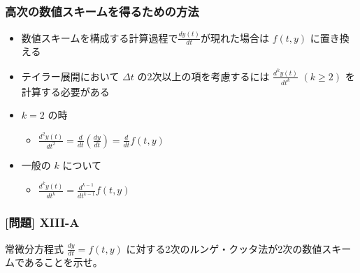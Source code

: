 \documentclass[dvipdfmx,aspectratio=169,20pt]{beamer}
\newcommand{\myfontsetting}[3]{{\fontsize{#1}{#2}\selectfont #3}}
\begin{document}
\begin{frame}
\frametitle{\large 高次の数値スキームを得るための方法}
\begin{itemize}
    \item \myfontsetting{14pt}{14pt}{数値スキームを構成する計算過程で\myfontsetting{12pt}{12pt}{$\displaystyle \frac{dy(t)}{dt}$}が現れた場合は $f(t,y)$ に置き換える}
    \item \myfontsetting{14pt}{14pt}{テイラー展開において $\varDelta t$ の2次以上の項を考慮するには \myfontsetting{12pt}{12pt}{$\displaystyle \frac{d^k y(t)}{dt^k}$ $(k\ge 2)$} を計算する必要がある}
    \item \myfontsetting{14pt}{14pt}{$k=2$ の時}
    \begin{itemize}
        \item \myfontsetting{12pt}{12pt}{$\displaystyle\frac{d^2y(t)}{dt^2}=\frac{d}{dt}\left(\frac{dy}{dt} \right) = \frac{d}{dt}f(t,y)$} 
    \end{itemize}
    \item \myfontsetting{14pt}{14pt}{一般の $k$ について}
    \begin{itemize}
        \item \myfontsetting{12pt}{12pt}{$\displaystyle\frac{d^ky(t)}{dt^k}=\frac{d^{k-1}}{dt^{k-1}}f(t,y)$} 
    \end{itemize}
\end{itemize}
\end{frame}
\begin{frame}
\frametitle{[問題] X\hspace{-.1em}I\hspace{-.1em}I\hspace{-.1em}I-A}


常微分方程式 \myfontsetting{15pt}{15pt}{$\displaystyle \frac{dy}{dt} = f(t,y)$} に対する2次のルンゲ・クッタ法が2次の数値スキームであることを示せ。

\end{frame}
\end{document}
